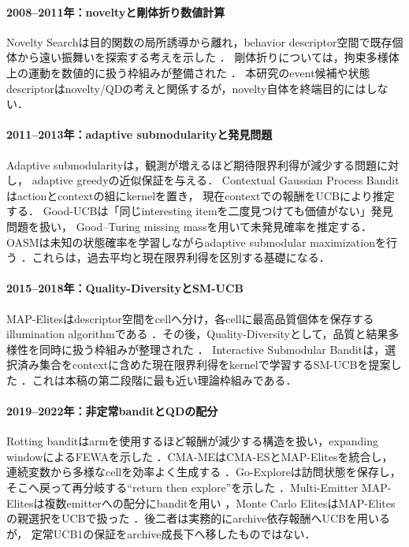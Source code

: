 \documentclass[a4paper,11pt]{ltjsarticle}
\begin{document}
\paragraph{2008--2011年：noveltyと剛体折り数値計算}
Novelty Searchは目的関数の局所誘導から離れ，behavior descriptor空間で既存個体から遠い振舞いを探索する考えを示した
\citep{lehman2008novelty,lehman2011novelty}．
剛体折りについては，拘束多様体上の運動を数値的に扱う枠組みが整備された
\citep{tachi2009simulation,wu2010rigid}．
本研究のevent候補や状態descriptorはnovelty/QDの考えと関係するが，novelty自体を終端目的にはしない．

\paragraph{2011--2013年：adaptive submodularityと発見問題}
Adaptive submodularityは，観測が増えるほど期待限界利得が減少する問題に対し，
adaptive greedyの近似保証を与える\citep{golovin2011adaptive}．
Contextual Gaussian Process Banditはactionとcontextの組にkernelを置き，
現在contextでの報酬をUCBにより推定する\citep{krause2011contextualgp}．
Good-UCBは「同じinteresting itemを二度見つけても価値がない」発見問題を扱い，
Good--Turing missing massを用いて未発見確率を推定する\citep{bubeck2013gooducb}．
OASMは未知の状態確率を学習しながらadaptive submodular maximizationを行う
\citep{gabillon2013oasm}．これらは，過去平均と現在限界利得を区別する基礎になる．

\paragraph{2015--2018年：Quality-DiversityとSM-UCB}
MAP-Elitesはdescriptor空間をcellへ分け，各cellに最高品質個体を保存するillumination algorithmである
\citep{mouret2015mapelites}．その後，Quality-Diversityとして，品質と結果多様性を同時に扱う枠組みが整理された
\citep{pugh2016qd,cully2018framework}．
Interactive Submodular Banditは，選択済み集合をcontextに含めた現在限界利得をkernelで学習するSM-UCBを提案した
\citep{chen2017smucb}．これは本稿の第二段階に最も近い理論枠組みである．

\paragraph{2019--2022年：非定常banditとQDの配分}
Rotting banditはarmを使用するほど報酬が減少する構造を扱い，expanding windowによるFEWAを示した
\citep{seznec2019rotting}．CMA-MEはCMA-ESとMAP-Elitesを統合し，連続変数から多様なcellを効率よく生成する
\citep{fontaine2020cmame}．Go-Exploreは訪問状態を保存し，そこへ戻って再分岐する``return then explore''を示した
\citep{ecoffet2021goexplore}．Multi-Emitter MAP-Elitesは複数emitterへの配分にbanditを用い
\citep{cully2021multiemitter}，Monte Carlo ElitesはMAP-Elitesの親選択をUCBで扱った
\citep{sfikas2021mce}．後二者は実務的にarchive依存報酬へUCBを用いるが，
定常UCB1の保証をarchive成長下へ移したものではない．
\end{document}
